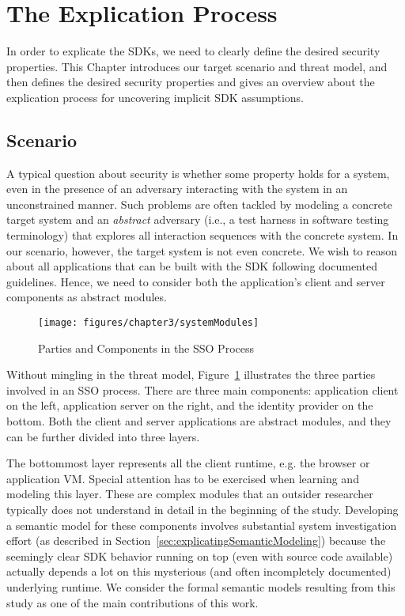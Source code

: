 \section{The Explication Process}
\label{sec:explicatingExplicationProcess}

In order to explicate the SDKs, we need to clearly define the desired security properties. This Chapter introduces our target scenario and threat model, and then defines the desired security properties and gives an overview about the explication process for uncovering implicit SDK assumptions.

\subsection{Scenario}

A typical question about security is whether some property holds for a system, even in the presence of an adversary interacting with the system in an unconstrained manner.  Such problems are often tackled by modeling a concrete target system and an \emph{abstract} adversary (i.e., a test harness in software testing terminology) that explores all interaction sequences with the concrete system.  In our scenario, however, the target system is not even concrete.  We wish to reason about all applications that can be built with the SDK following documented guidelines.  Hence, we need to consider both the application's client and server components as abstract modules.

\begin{figure}[hbt]
\centering
\texttt{[image: figures/chapter3/systemModules]}
\caption{Parties and Components in the SSO Process}
\label{fig:systemModulesExplicating}
\end{figure}

Without mingling in the threat model, Figure~\ref{fig:systemModulesExplicating} illustrates the three parties involved in an SSO process. There are three main components: application client on the left, application server on the right, and the identity provider on the bottom.  Both the client and server applications are abstract modules, and they can be further divided into three layers.  

The bottommost layer represents all the client runtime, e.g. the browser or application VM.  Special attention has to be exercised when learning and modeling this layer.  These are complex modules that an outsider researcher typically does not understand in detail in the beginning of the study.  Developing a semantic model for these components involves substantial system investigation effort (as described in Section~\ref{sec:explicatingSemanticModeling}) because the seemingly clear SDK behavior running on top (even with source code available) actually depends a lot on this mysterious (and often incompletely documented) underlying runtime.  We consider the formal semantic models resulting from this study as one of the main contributions of this work.

